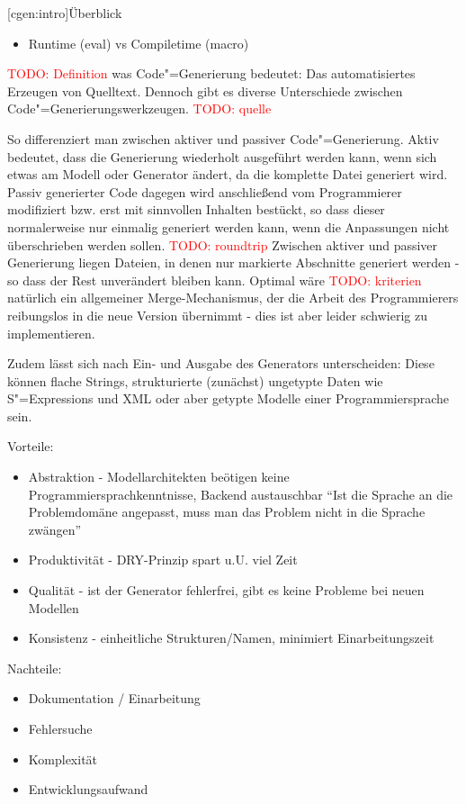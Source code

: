\documentclass[a4paper, bibgerm]{book}
\newcommand{\todo}[1]{
  \textcolor{red}{TODO: #1}
}
\newcommand\lsection{}
\newcommand{\sexps}{S"=Expressions}
\newcommand{\cgen}{Code"=Generierung}
\begin{document}
\lsection[cgen:intro]{Überblick}

\begin{itemize}
\item Runtime (eval) vs Compiletime (macro)
\end{itemize}

\todo{Definition} was \cgen{} bedeutet:
Das automatisiertes Erzeugen von Quelltext. Dennoch gibt es diverse
Unterschiede zwischen \cgen{}swerkzeugen. \todo{quelle}

So differenziert man zwischen aktiver und passiver
\cgen{}. Aktiv bedeutet, dass die Generierung wiederholt
ausgeführt werden kann, wenn sich etwas am Modell oder Generator
ändert, da die komplette Datei generiert wird. Passiv generierter Code
dagegen wird anschließend vom Programmierer modifiziert bzw. erst mit
sinnvollen Inhalten bestückt, so dass dieser normalerweise nur
einmalig generiert werden kann, wenn die Anpassungen nicht
überschrieben werden sollen. \todo{roundtrip} Zwischen aktiver und
passiver Generierung liegen Dateien, in denen nur markierte Abschnitte
generiert werden - so dass der Rest unverändert bleiben kann. Optimal
wäre \todo{kriterien} natürlich ein allgemeiner Merge-Mechanismus, der die Arbeit des
Programmierers reibungslos in die neue Version übernimmt - dies ist
aber leider schwierig zu implementieren.

Zudem lässt sich nach Ein- und Ausgabe des Generators unterscheiden:
Diese können flache Strings, strukturierte (zunächst) ungetypte Daten wie \sexps{}
und XML oder aber getypte Modelle einer Programmiersprache sein.

Vorteile:
\begin{itemize}
\item Abstraktion - Modellarchitekten beötigen keine
  Programmiersprachkenntnisse, Backend austauschbar
``Ist die Sprache an die Problemdomäne angepasst, muss man das Problem
nicht in die Sprache zwängen''
\item Produktivität - DRY-Prinzip spart u.U. viel Zeit
\item Qualität - ist der Generator fehlerfrei, gibt es keine Probleme
  bei neuen Modellen
\item Konsistenz - einheitliche Strukturen/Namen, minimiert Einarbeitungszeit
\end{itemize}

Nachteile:
\begin{itemize}
\item Dokumentation / Einarbeitung
\item Fehlersuche
\item Komplexität
\item Entwicklungsaufwand
\end{itemize}
\end{document}
